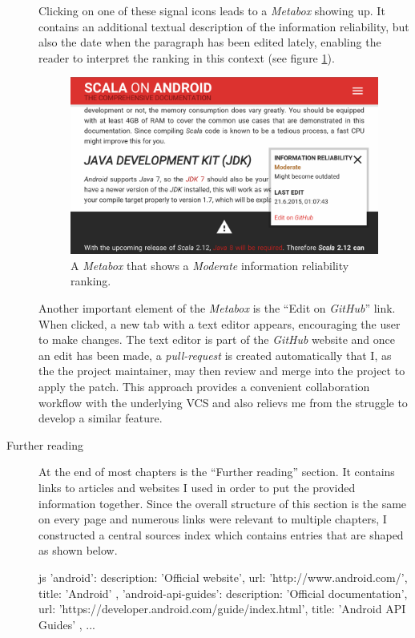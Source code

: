 \begin{description}
	Clicking on one of these signal icons leads to a \textit{Metabox} showing up. It contains an additional textual description of the information reliability, but also the date when the paragraph has been edited lately, enabling the reader to interpret the ranking in this context (see figure \ref{metabox}).

	\begin{figure}[]
		\includegraphics[width=\textwidth]{asset/metabox.png}
		\caption{A \textit{Metabox} that shows a \textit{Moderate} information reliability ranking.}
		\label{metabox}
	\end{figure}

	Another important element of the \textit{Metabox} is the \enquote{Edit on \textit{GitHub}} link. When clicked, a new tab with a text editor appears, encouraging the user to make changes. The text editor is part of the \textit{GitHub} website and once an edit has been made, a \textit{pull-request} is created automatically that I, as the the project maintainer, may then review and merge into the project to apply the patch. This approach provides a convenient collaboration workflow with the underlying \ac{VCS} and also relievs me from the struggle to develop a similar feature.

	\item[Further reading]\hfill

	At the end of most chapters is the \enquote{Further reading} section. It contains links to articles and websites I used in order to put the provided information together. Since the overall structure of this section is the same on every page and numerous links were relevant to multiple chapters, I constructed a central sources index which contains entries that are shaped as shown below.

	\begin{code}{js}
'android':
{
	description: 'Official website',
	url: 'http://www.android.com/',
	title: 'Android'
},
'android-api-guides':
{
	description: 'Official documentation',
	url: 'https://developer.android.com/guide/index.html',
	title: 'Android API Guides'
},
...
	\end{code}


\end{description}
